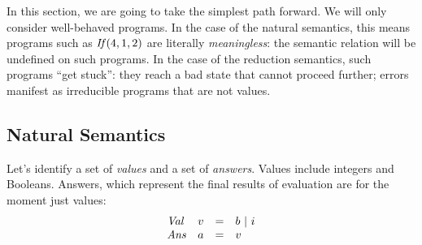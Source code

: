 In this section, we are going to take the simplest path forward.  We
will only consider well-behaved programs.  In the case of the natural
semantics, this means programs such as $\mathit{If}(4,1,2)$ are literally
\emph{meaningless}: the semantic relation will be undefined on such
programs.  In the case of the reduction semantics, such programs ``get
stuck'': they reach a bad state that cannot proceed further; errors
manifest as irreducible programs that are not values.

\subsection{Natural Semantics}

Let's identify a set of \emph{values} and a set of \emph{answers}.
Values include integers and Booleans.  Answers, which represent the
final results of evaluation are for the moment just values:
\[
\begin{array}{llcl}
\mathit{Val} & v & = & b\ |\ i\\
\mathit{Ans} & a & = & v\\
\end{array}
\]


